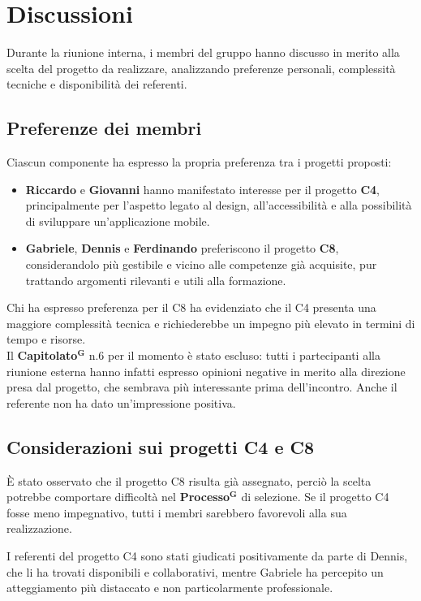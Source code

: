 \documentclass[a4paper,12pt]{article}
\newcommand{\term}[1]{\textbf{#1}$^\mathbf{G}$}
\begin{document}
\section{Discussioni}
Durante la riunione interna, i membri del gruppo hanno discusso in merito alla scelta del progetto da realizzare, analizzando preferenze personali, complessità tecniche e disponibilità dei referenti.

\subsection{Preferenze dei membri}
Ciascun componente ha espresso la propria preferenza tra i progetti proposti:
\begin{itemize}
    \item \textbf{Riccardo} e \textbf{Giovanni} hanno manifestato interesse per il progetto \textbf{C4}, principalmente per l’aspetto legato al design, all’accessibilità e alla possibilità di sviluppare un’applicazione mobile.
    \item \textbf{Gabriele}, \textbf{Dennis} e \textbf{Ferdinando} preferiscono il progetto \textbf{C8}, considerandolo più gestibile e vicino alle competenze già acquisite, pur trattando argomenti rilevanti e utili alla formazione.
\end{itemize}
Chi ha espresso preferenza per il C8 ha evidenziato che il C4 presenta una maggiore complessità tecnica e richiederebbe un impegno più elevato in termini di tempo e risorse.  
\\
Il \term{Capitolato} n.6 per il momento è stato escluso: tutti i partecipanti alla riunione esterna hanno infatti espresso opinioni negative in merito alla direzione presa dal progetto, che sembrava più interessante prima dell'incontro. Anche il referente non ha dato un'impressione positiva.

\subsection{Considerazioni sui progetti C4 e C8}
È stato osservato che il progetto C8 risulta già assegnato, perciò la scelta potrebbe comportare difficoltà nel \term{Processo} di selezione.  
Se il progetto C4 fosse meno impegnativo, tutti i membri sarebbero favorevoli alla sua realizzazione.  

I referenti del progetto C4 sono stati giudicati positivamente da parte di Dennis, che li ha trovati disponibili e collaborativi, mentre Gabriele ha percepito un atteggiamento più distaccato e non particolarmente professionale.
\end{document}
